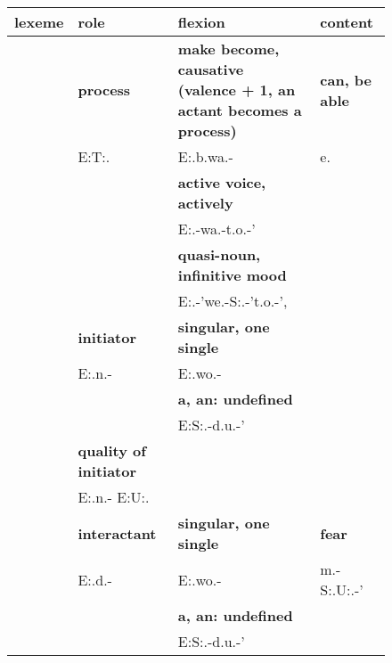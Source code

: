 \documentclass{article}%
\begin{document}
%

\begin{figure}
\centering

\begin{tabular}{|llll|}
\hline
lexeme & role & flexion & content \\
\hline
\cellcolor[HTML]{fa8072}\textbf{} &\cellcolor[HTML]{fa8072}\textbf{process} &\cellcolor[HTML]{fa8072}\textbf{make become, causative (valence + 1, an actant becomes a process)} &\cellcolor[HTML]{fa8072}\textbf{can, be able}\\
\cellcolor[HTML]{fa8072} &\cellcolor[HTML]{fa8072}E:T:. &\cellcolor[HTML]{fa8072}E:.b.wa.- &\cellcolor[HTML]{fa8072}e.\\
\cellcolor[HTML]{fa8072} &\cellcolor[HTML]{fa8072} &\cellcolor[HTML]{fa8072}\textbf{active voice, actively} &\cellcolor[HTML]{fa8072}\\
\cellcolor[HTML]{fa8072} &\cellcolor[HTML]{fa8072} &\cellcolor[HTML]{fa8072}E:.-wa.-t.o.-' &\cellcolor[HTML]{fa8072}\\
\cellcolor[HTML]{fa8072} &\cellcolor[HTML]{fa8072} &\cellcolor[HTML]{fa8072}\textbf{quasi-noun, infinitive mood} &\cellcolor[HTML]{fa8072}\\
\cellcolor[HTML]{fa8072} &\cellcolor[HTML]{fa8072} &\cellcolor[HTML]{fa8072}E:.-'we.-S:.-'t.o.-', &\cellcolor[HTML]{fa8072}\\
\hline
\cellcolor[HTML]{87CEEB}\textbf{} &\cellcolor[HTML]{87CEEB}\textbf{initiator} &\cellcolor[HTML]{87CEEB}\textbf{singular, one single} &\cellcolor[HTML]{87CEEB}\\
\cellcolor[HTML]{87CEEB} &\cellcolor[HTML]{87CEEB}E:.n.- &\cellcolor[HTML]{87CEEB}E:.wo.- &\cellcolor[HTML]{87CEEB}\\
\cellcolor[HTML]{87CEEB} &\cellcolor[HTML]{87CEEB} &\cellcolor[HTML]{87CEEB}\textbf{a, an: undefined} &\cellcolor[HTML]{87CEEB}\\
\cellcolor[HTML]{87CEEB} &\cellcolor[HTML]{87CEEB} &\cellcolor[HTML]{87CEEB}E:S:.-d.u.-' &\cellcolor[HTML]{87CEEB}\\
\hline
\cellcolor[HTML]{87CEEB}\textbf{} &\cellcolor[HTML]{87CEEB}\textbf{quality of initiator} &\cellcolor[HTML]{87CEEB} &\cellcolor[HTML]{87CEEB}\\
\cellcolor[HTML]{87CEEB} &\cellcolor[HTML]{87CEEB}E:.n.- E:U:. &\cellcolor[HTML]{87CEEB} &\cellcolor[HTML]{87CEEB}\\
\hline
\cellcolor[HTML]{87CEEB}\textbf{} &\cellcolor[HTML]{87CEEB}\textbf{interactant} &\cellcolor[HTML]{87CEEB}\textbf{singular, one single} &\cellcolor[HTML]{87CEEB}\textbf{fear}\\
\cellcolor[HTML]{87CEEB} &\cellcolor[HTML]{87CEEB}E:.d.- &\cellcolor[HTML]{87CEEB}E:.wo.- &\cellcolor[HTML]{87CEEB}m.-S:.U:.-'\\
\cellcolor[HTML]{87CEEB} &\cellcolor[HTML]{87CEEB} &\cellcolor[HTML]{87CEEB}\textbf{a, an: undefined} &\cellcolor[HTML]{87CEEB}\\
\cellcolor[HTML]{87CEEB} &\cellcolor[HTML]{87CEEB} &\cellcolor[HTML]{87CEEB}E:S:.-d.u.-' &\cellcolor[HTML]{87CEEB}\\
\hline


\end{tabular}
\end{figure}
\end{document}
